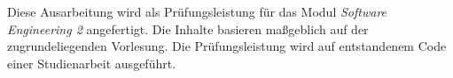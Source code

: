 
Diese Ausarbeitung wird als Prüfungsleistung für das Modul \textit{Software Engineering 2} angefertigt.
Die Inhalte basieren maßgeblich auf der zugrundeliegenden Vorlesung.
Die Prüfungsleistung wird auf entstandenem Code einer Studienarbeit ausgeführt.


